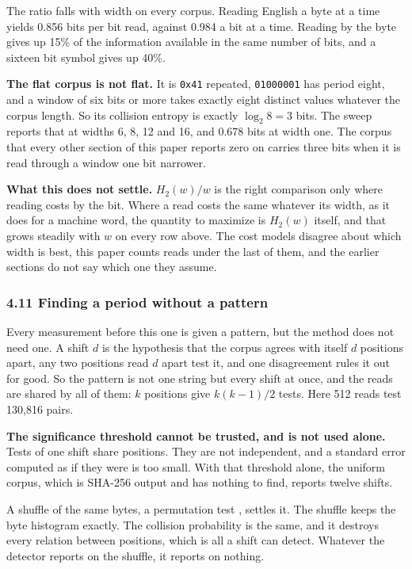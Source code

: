 The ratio falls with width on every corpus. Reading English a byte at a time yields 0.856 bits per bit read, against 0.984 a bit at a time. Reading by the byte gives up 15\% of the information available in the same number of bits, and a sixteen bit symbol gives up 40\%.

\noindent\textbf{The flat corpus is not flat.} It is \texttt{0x41} repeated, \texttt{01000001} has period eight, and a window of six bits or more takes exactly eight distinct values whatever the corpus length. So its collision entropy is exactly \(\log_2 8 = 3\) bits. The sweep reports that at widths 6, 8, 12 and 16, and 0.678 bits at width one. The corpus that every other section of this paper reports zero on carries three bits when it is read through a window one bit narrower.

\noindent\textbf{What this does not settle.} \(H_2(w)/w\) is the right comparison only where reading costs by the bit. Where a read costs the same whatever its width, as it does for a machine word, the quantity to maximize is \(H_2(w)\) itself, and that grows steadily with \(w\) on every row above. The cost models disagree about which width is best, this paper counts reads under the last of them, and the earlier sections do not say which one they assume.

\subsubsection{4.11 Finding a period without a pattern}

Every measurement before this one is given a pattern, but the method does not need one. A shift \(d\) is the hypothesis that the corpus agrees with itself \(d\) positions apart, any two positions read \(d\) apart test it, and one disagreement rules it out for good. So the pattern is not one string but every shift at once, and the reads are shared by all of them: \(k\) positions give \(k(k-1)/2\) tests. Here 512 reads test 130,816 pairs.

\noindent\textbf{The significance threshold cannot be trusted, and is not used alone.} Tests of one shift share positions. They are not independent, and a standard error computed as if they were is too small. With that threshold alone, the uniform corpus, which is SHA-256 output and has nothing to find, reports twelve shifts.

A shuffle of the same bytes, a permutation test \cite{src:Good-2005}, settles it. The shuffle keeps the byte histogram exactly. The collision probability is the same, and it destroys every relation between positions, which is all a shift can detect. Whatever the detector reports on the shuffle, it reports on nothing.


